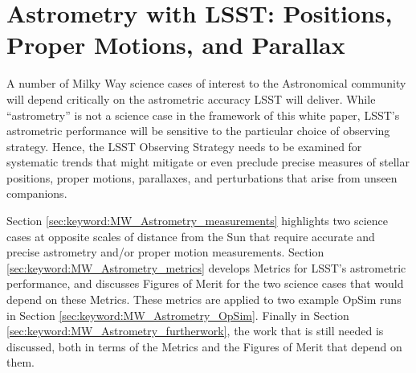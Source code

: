\section{Astrometry with LSST: Positions, Proper Motions, and Parallax}
\def\secname{MW_Astrometry}\label{sec:\secname} %


A number of Milky Way science cases of interest to the Astronomical
community will depend critically on the astrometric accuracy LSST will
deliver. While ``astrometry'' is not a science case in the framework
of this white paper, LSST's astrometric performance will be sensitive
to the particular choice of observing strategy.
Hence, the LSST Observing Strategy needs to be examined for systematic
trends that might mitigate or even preclude precise measures of
stellar positions, proper motions, parallaxes, and perturbations that
arise from unseen companions.

Section \ref{sec:keyword:MW_Astrometry_measurements} highlights two
science cases at opposite scales of distance from the Sun that require
accurate and precise astrometry and/or proper motion
measurements. Section \ref{sec:keyword:MW_Astrometry_metrics} develops
Metrics for LSST's astrometric performance, and discusses Figures of
Merit for the two science cases that would depend on these
Metrics. These metrics are applied to two example OpSim runs in
Section \ref{sec:keyword:MW_Astrometry_OpSim}. Finally in Section
\ref{sec:keyword:MW_Astrometry_furtherwork}, the work that is still
needed is discussed, both in terms of the Metrics and the Figures of
Merit that depend on them.



